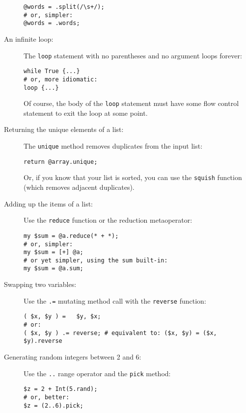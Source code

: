\begin{description}
\begin{verbatim}
@words = .split(/\s+/);
# or, simpler:
@words = .words;
\end{verbatim}

\item[An infinite loop:] The {\tt loop} statement with no parentheses 
and no argument loops forever: 

\begin{verbatim}
while True {...}
# or, more idiomatic:
loop {...}   
\end{verbatim}

Of course, the body of the {\tt loop} statement must have some 
flow control statement to exit the loop at some point.

\item[Returning the unique elements of a list:] The {\tt unique} 
method removes duplicates from the input list:

\begin{verbatim}
return @array.unique;
\end{verbatim}

Or, if you know that your list is sorted, you can use the 
{\tt squish} function (which removes adjacent duplicates).

\item[Adding up the items of a list:] Use the {\tt reduce} 
function or the reduction metaoperator:

\begin{verbatim}
my $sum = @a.reduce(* + *);
# or, simpler:
my $sum = [+] @a;
# or yet simpler, using the sum built-in:
my $sum = @a.sum;  
\end{verbatim}

\item[Swapping two variables:] Use the \verb'.=' mutating 
method call with the \verb'reverse' function:
\begin{verbatim}
( $x, $y ) =   $y, $x;
# or:
( $x, $y ) .= reverse; # equivalent to: ($x, $y) = ($x, $y).reverse
\end{verbatim}

\item[Generating random integers between 2 and 6:] Use the \verb'..' 
range operator and the {\tt pick} method:
\begin{verbatim}
$z = 2 + Int(5.rand);
# or, better:
$z = (2..6).pick;
\end{verbatim}


\end{description}
